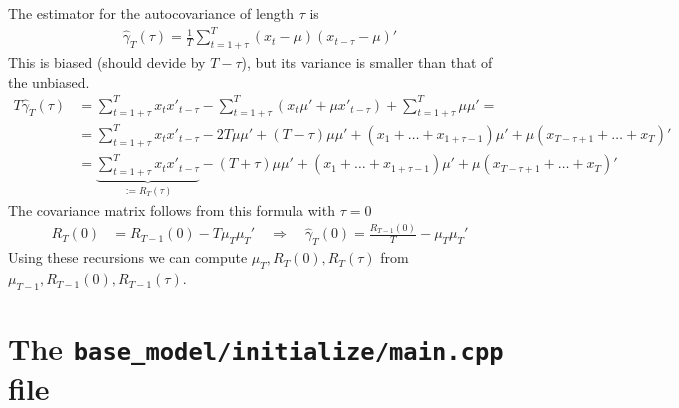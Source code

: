 \documentclass[11pt, letterpaper, notitlepage]{article}
\begin{document}
The estimator for the autocovariance of length $\tau$ is
\begin{align*}
\widehat\gamma_T(\tau) = \frac{1}{T} \sum_{t=1+\tau}^{T}(x_t - \mu)(x_{t-\tau}-\mu)'
\end{align*}
This is biased (should devide by $T-\tau$), but its variance is smaller than that of the unbiased.
\begin{align*}
T\widehat\gamma_T(\tau) &= \sum_{t=1+\tau}^{T}x_t x'_{t-\tau} - \sum_{t=1+\tau}^{T} (x_t\mu' + \mu x'_{t-\tau}) + \sum_{t=1+\tau}^{T}\mu\mu' = \\
&= \sum_{t=1+\tau}^{T}x_t x'_{t-\tau} - 2T\mu\mu' + (T-\tau)\mu\mu' + (x_1 + \dots + x_{1+\tau-1})\mu' + \mu(x_{T-\tau + 1} + \dots + x_T)' \\
&= \underbrace{\sum_{t=1+\tau}^{T}x_t x'_{t-\tau}}_{:= R_T(\tau)} - (T+\tau)\mu\mu' + (x_1 + \dots + x_{1+\tau-1})\mu' + \mu(x_{T-\tau + 1} + \dots + x_T)' 
\end{align*}
The covariance matrix follows from this formula with $\tau=0$
\begin{align*}
 R_T(0) &= R_{T-1}(0) - T \mu_T\mu_T' \quad \Rightarrow \quad \widehat{\gamma}_T(0)= \frac{R_{T-1}(0)}{T} - \mu_T\mu_T'
\end{align*}
Using these recursions we can compute $\mu_T, R_T(0), R_T(\tau)$ from $\mu_{T-1}, R_{T-1}(0), R_{T-1}(\tau)$.


\pagebreak


\section*{The \texttt{base\_model/initialize/main.cpp} file }
\end{document}

